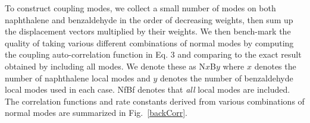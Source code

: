 To construct coupling modes, we collect a small number of modes on both naphthalene
and benzaldehyde in the order of decreasing weights, then sum up the displacement vectors
multiplied by their weights.
We then bench-mark the quality of taking various different  combinations
of normal modes by computing the coupling auto-correlation function in  Eq. 3 and comparing to
the exact result obtained by including all modes.
We denote these as N$x$B$y$ where $x$ denotes the number of naphthalene  local modes and $y$ denotes
the number of benzaldehyde  local modes used in each case.
NfBf denotes that {\em all} local modes are
included.   The correlation functions and rate constants derived from various
combinations of normal modes are summarized in Fig.~\ref{backCorr}.


\begin{figure}[!h]
 \\

\end{figure}
